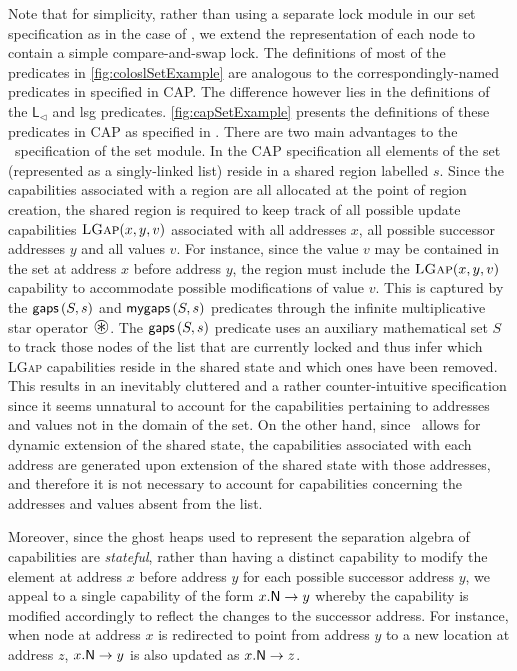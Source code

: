 Note that for simplicity, rather than using a separate lock module in our set specification as in the case of \cite{cap-ecoop10}, we extend the representation of each node to contain a simple compare-and-swap lock. The definitions of most of the predicates in \fig\ref{fig:coloslSetExample} are analogous to the correspondingly-named predicates in \cite{cap-ecoop10} specified in CAP. The difference however lies in the definitions of the 
$\textsf{L}_{\triangleleft}$ and \textsf{lsg} predicates. 
\fig\ref{fig:capSetExample} presents the definitions of these predicates in CAP as specified in \cite{cap-ecoop10}. 
There are two main advantages to the \colosl\ specification of the set module. In the CAP specification all elements of the set (represented as a singly-linked list) reside in a shared region labelled $s$. Since the capabilities associated with a region are all allocated at the point of region creation, the shared region is required to keep track of all possible update capabilities $\textsc{LGap}(x, y, v)$ associated with all addresses $x$, all possible successor addresses $y$ and all values $v$. For instance, since the value $v$ may be contained in the set at address $x$ before address $y$, the region must include the $\textsc{LGap}(x, y, v)$ capability to accommodate possible modifications of value $v$. This is captured by the $\textsf{gaps}\left(S, s\right)$ and $\textsf{mygaps}\left(S, s\right)$ predicates through the infinite multiplicative star operator $\iterStar$. The $\textsf{gaps}\left(S, s\right)$ predicate uses an auxiliary mathematical set $S$ to track those nodes of the list that are currently locked and thus infer which \textsc{LGap} capabilities reside in the shared state and which ones have been removed. This results in an inevitably cluttered and a rather counter-intuitive specification since it seems unnatural to account for the capabilities pertaining to addresses and values not in the domain of the set. On the other hand, since \colosl\ allows for dynamic extension of the shared state, the capabilities associated with each address are generated upon extension of the shared state with those addresses, and therefore it is not necessary to account for capabilities concerning the addresses and values absent from the list. 

Moreover, since the ghost heaps used to represent the separation algebra of capabilities are \emph{stateful}, rather than having a distinct capability to modify the element at address $x$ before address $y$ for each possible successor address $y$, we appeal to a single capability of the form $\nextT{x}{y}$ whereby the capability is modified accordingly to reflect the changes to the successor address. For instance, when node at address $x$ is redirected to point from address $y$ to a new location at address $z$, $\nextT{x}{y}$ is also updated as $\nextT{x}{z}$. 

